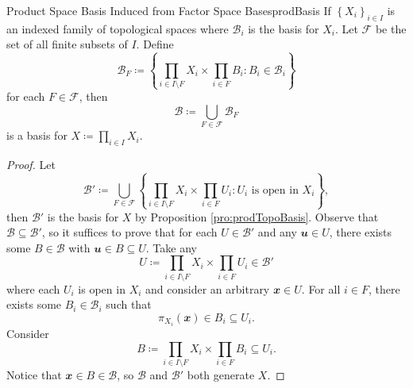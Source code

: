 \documentclass[math]{amznotes}
\theoremstyle{remark}
\begin{document}
\begin{probox}{Product Space Basis Induced from Factor Space Bases}{prodBasis}
    If $\left\{X_i\right\}_{i \in I}$ is an indexed family of topological spaces where $\mathcal{B}_i$ is the basis for $X_i$. Let $\mathcal{F}$ be the set of all finite subsets of $I$. Define 
    \begin{equation*}
        \mathcal{B}_F \coloneqq \left\{\prod_{i \in I \setminus F}X_i \times \prod_{i \in F}B_i \colon B_i \in \mathcal{B}_i\right\}
    \end{equation*}
    for each $F \in \mathcal{F}$, then 
    \begin{equation*}
        \mathcal{B} \coloneqq \bigcup_{F \in \mathcal{F}}\mathcal{B}_F
    \end{equation*}
    is a basis for $X \coloneqq \prod_{i \in I}X_i$.
    \tcblower
    \begin{proof}
        Let 
        \begin{equation*}
            \mathcal{B}' \coloneqq \bigcup_{F \in \mathcal{F}}\left\{\prod_{i \in I \setminus F}X_i \times \prod_{i \in F}U_i \colon U_i \textrm{ is open in } X_i\right\},
        \end{equation*}
        then $\mathcal{B}'$ is the basis for $X$ by Proposition \ref{pro:prodTopoBasis}. Observe that $\mathcal{B} \subseteq \mathcal{B}'$, so it suffices to prove that for each $U \in \mathcal{B}'$ and any $\mathbfit{u} \in U$, there exists some $B \in \mathcal{B}$ with $\mathbfit{u} \in B \subseteq U$. Take any 
        \begin{equation*}
            U \coloneqq \prod_{i \in I \setminus F}X_i \times \prod_{i \in F}U_i \in \mathcal{B}'
        \end{equation*}
        where each $U_i$ is open in $X_i$ and consider an arbitrary $\mathbfit{x} \in U$. For all $i \in F$, there exists some $B_i \in \mathcal{B}_i$ such that 
        \begin{equation*}
            \pi_{X_i}\left(\mathbfit{x}\right) \in B_i \subseteq U_i.
        \end{equation*}
        Consider 
        \begin{equation*}
            B \coloneqq \prod_{i \in I \setminus F}X_i \times \prod_{i \in F}B_i \subseteq U_i.
        \end{equation*}
        Notice that $\mathbfit{x} \in B \in \mathcal{B}$, so $\mathcal{B}$ and $\mathcal{B}'$ both generate $X$.
    \end{proof}
\end{probox}
\end{document}
